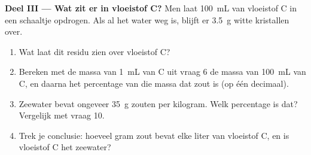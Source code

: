 \begin{problem}
\medskip
\noindent\textbf{Deel III --- Wat zit er in vloeistof C?}
Men laat \qty{100}{mL} van vloeistof C in een schaaltje opdrogen. Als al
het water weg is, blijft er \qty{3.5}{g} witte kristallen over.
\begin{enumerate}[resume]
  \item Wat laat dit residu zien over vloeistof C?
  \item Bereken met de massa van \qty{1}{mL} van C uit vraag 6 de massa
        van \qty{100}{mL} van C, en daarna het percentage van die massa
        dat zout is (op één decimaal).
  \item Zeewater bevat ongeveer \qty{35}{g} zouten per kilogram. Welk
        percentage is dat? Vergelijk met vraag 10.
  \item Trek je conclusie: hoeveel gram zout bevat elke liter van
        vloeistof C, en is vloeistof C het zeewater?
\end{enumerate}
\end{problem}

